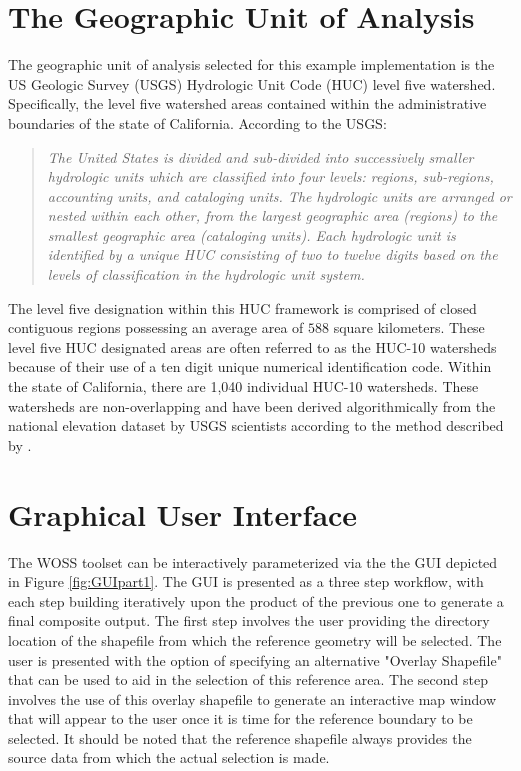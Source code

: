 \section{The Geographic Unit of Analysis}
    
The geographic unit of analysis selected for this example implementation is the US Geologic Survey (USGS) Hydrologic Unit Code (HUC) level five watershed. Specifically, the level five watershed areas contained within the administrative boundaries of the state of California. According to the USGS:

    \blockquote{\textit{The United States is divided and sub-divided into successively smaller hydrologic units which are classified into four levels: regions, sub-regions, accounting units, and cataloging units. The hydrologic units are arranged or nested within each other, from the largest geographic area (regions) to the smallest geographic area (cataloging units). Each hydrologic unit is identified by a unique HUC consisting of two to twelve digits based on the levels of classification in the hydrologic unit system. \cite{Seaber1987}}}
    
The level five designation within this HUC framework is comprised of closed contiguous regions possessing an average area of $588$ square kilometers. These level five HUC designated areas are often referred to as the HUC-10 watersheds because of their use of a ten digit unique numerical identification code. Within the state of California, there are 1,040 individual HUC-10 watersheds. These watersheds are non-overlapping and have been derived algorithmically from the national elevation dataset by USGS scientists according to the method described by \cite{Seaber1987}.
    
\section{Graphical User Interface}
   
The WOSS toolset can be interactively parameterized via the the GUI depicted in Figure \ref{fig:GUIpart1}. The GUI is presented as a three step workflow, with each step building iteratively upon the product of the previous one to generate a final composite output. The first step involves the user providing the directory location of the shapefile from which the reference geometry will be selected. The user is presented with the option of specifying an alternative "Overlay Shapefile" that can be used to aid in the selection of this reference area. The second step involves the use of this overlay shapefile to generate an interactive map window that will appear to the user once it is time for the reference boundary to be selected. It should be noted that the reference shapefile always provides the source data from which the actual selection is made. 

